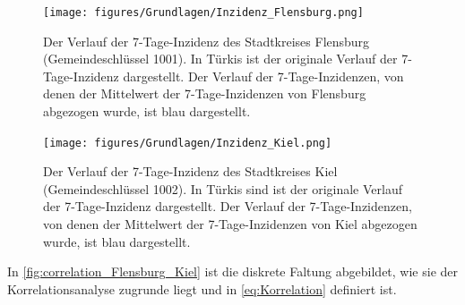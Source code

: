 \begin{figure}[H]
    \centering
    \texttt{[image: figures/Grundlagen/Inzidenz\_Flensburg.png]}
    \caption{Der Verlauf der 7-Tage-Inzidenz des Stadtkreises Flensburg (Gemeindeschlüssel 1001).
    In Türkis ist der originale Verlauf der 7-Tage-Inzidenz dargestellt. Der Verlauf der 7-Tage-Inzidenzen, von denen der Mittelwert der 7-Tage-Inzidenzen von Flensburg abgezogen wurde, ist blau dargestellt.}
    \label{fig:Inzidenz_Flensburg}
\end{figure}
\begin{figure}[H]
    \centering
    \texttt{[image: figures/Grundlagen/Inzidenz\_Kiel.png]}
    \caption{Der Verlauf der 7-Tage-Inzidenz des Stadtkreises Kiel (Gemeindeschlüssel 1002).
    In Türkis sind ist der originale Verlauf der 7-Tage-Inzidenz dargestellt. Der Verlauf der 7-Tage-Inzidenzen, von denen der Mittelwert der 7-Tage-Inzidenzen von Kiel abgezogen wurde, ist blau dargestellt.}
    \label{fig:Inzidenz_Kiel}
\end{figure}
In \autoref{fig:correlation_Flensburg_Kiel} ist die diskrete Faltung abgebildet, wie sie der Korrelationsanalyse zugrunde liegt und in \autoref{eq:Korrelation} definiert ist.

